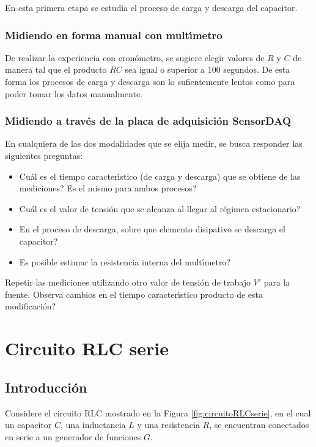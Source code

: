 \documentclass[laboratorio]{guia}
\begin{document}
En esta primera etapa se estudia el proceso de carga y descarga del capacitor. 

\subsubsection{Midiendo en forma manual con mult\'\i metro}

De realizar la experiencia con cron\'ometro, se sugiere elegir valores de $R$ y
$C$ de manera tal que el producto $RC$ sea igual o superior a 100 segundos. De
esta forma los procesos de carga y descarga son lo sufientemente lentos como
para poder tomar los datos manualmente. 

\subsubsection{Midiendo a trav\'es de la placa de adquisici\'on SensorDAQ}

En cualquiera de las dos modalidades que se elija medir, se busca responder
las siguientes preguntas:
\begin{itemize}
    \item Cu\'al es el tiempo caracter\'\i stico (de carga y descarga) que se 
        obtiene de las  mediciones? Es el mismo para ambos procesos?
    \item Cu\'al es el valor de tensi\'on que se alcanza al llegar al 
        r\'egimen estacionario? 
    \item En el proceso de descarga, sobre que elemento disipativo se 
        descarga el capacitor?
    \item Es posible estimar la resistencia interna del mult\'\i metro? 
\end{itemize}

Repetir las mediciones utilizando otro valor de tensi\'on de trabajo $V'$
para la fuente. Observa cambios en el tiempo caracter\'\i stico producto de
esta modificaci\'on?

\section{Circuito RLC serie}

\subsection{Introducci\'on}

Considere el circuito RLC mostrado en la Figura \ref{fig:circuitoRLCserie}, en el
cual un capacitor $C$, una inductancia $L$ y una resistencia
$R$, se encuentran conectados en serie a un generador
de funciones $G$.
\end{document}
